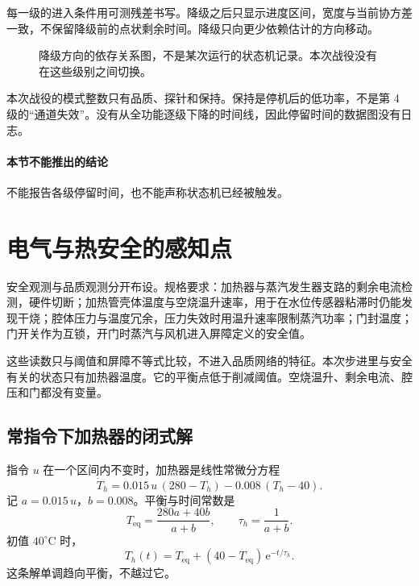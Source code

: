 每一级的进入条件用可测残差书写。降级之后只显示进度区间，宽度与当前协方差一致，不保留降级前的点状剩余时间。降级只向更少依赖估计的方向移动。

\begin{figure}[ht]
\centering
{}
\caption{降级方向的依存关系图，不是某次运行的状态机记录。本次战役没有在这些级别之间切换。}
\end{figure}

本次战役的模式整数只有品质、探针和保持。保持是停机后的低功率，不是第 4 级的“通道失效”。没有从全功能逐级下降的时间线，因此停留时间的数据图没有日志。

\paragraph{本节不能推出的结论}
不能报告各级停留时间，也不能声称状态机已经被触发。

\section{电气与热安全的感知点}

安全观测与品质观测分开布设。规格要求：加热器与蒸汽发生器支路的剩余电流检测，硬件切断；加热管壳体温度与空烧温升速率，用于在水位传感器粘滞时仍能发现干烧；腔体压力与温度冗余，压力失效时用温升速率限制蒸汽功率；门封温度；门开关作为互锁，开门时蒸汽与风机进入屏障定义的安全值。

这些读数只与阈值和屏障不等式比较，不进入品质网络的特征。本次步进里与安全有关的状态只有加热器温度。它的平衡点低于削减阈值。空烧温升、剩余电流、腔压和门都没有变量。

\subsection{常指令下加热器的闭式解}

指令 \(u\) 在一个区间内不变时，加热器是线性常微分方程
\[
\dot T_h=0.015\,u\,(280-T_h)-0.008\,(T_h-40).
\]
记 \(a=0.015\,u\)，\(b=0.008\)。平衡与时间常数是
\begin{equation}
\label{eq:heater}
T_{\mathrm{eq}}=\frac{280a+40b}{a+b},\qquad
\tau_h=\frac{1}{a+b}.
\end{equation}
初值 \(40^\circ\mathrm{C}\) 时，
\[
T_h(t)=T_{\mathrm{eq}}+(40-T_{\mathrm{eq}})\,\mathrm{e}^{-t/\tau_h}.
\]
这条解单调趋向平衡，不越过它。

